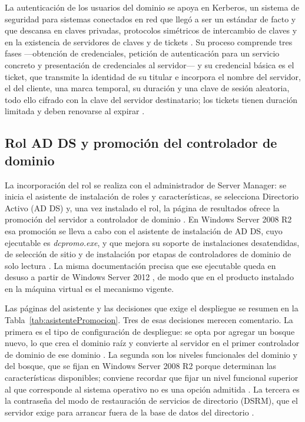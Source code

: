 \documentclass[12pt]{article}
\begin{document}
La autenticación de los usuarios del dominio se apoya en Kerberos, un sistema de seguridad para sistemas conectados en red que llegó a ser un estándar de facto y que descansa en claves privadas, protocolos simétricos de intercambio de claves y en la existencia de servidores de claves y de tickets \parencite[\S 9.7, p.\ 552]{carretero2001sistemas}. Su proceso comprende tres fases ---obtención de credenciales, petición de autenticación para un servicio concreto y presentación de credenciales al servidor--- y su credencial básica es el ticket, que transmite la identidad de su titular e incorpora el nombre del servidor, el del cliente, una marca temporal, su duración y una clave de sesión aleatoria, todo ello cifrado con la clave del servidor destinatario; los tickets tienen duración limitada y deben renovarse al expirar \parencite[\S 9.7, p.\ 554]{carretero2001sistemas}.

\subsection{Rol AD DS y promoción del controlador de dominio}
\label{sec:promocionControladorDominio}

La incorporación del rol se realiza con el administrador de Server Manager: se inicia el asistente de instalación de roles y características, se selecciona Directorio Activo (AD DS) y, una vez instalado el rol, la página de resultados ofrece la promoción del servidor a controlador de dominio \parencite{microsoftInstallADDS}. En Windows Server 2008 R2 esa promoción se lleva a cabo con el asistente de instalación de AD DS, cuyo ejecutable es \textit{dcpromo.exe}, y que mejora su soporte de instalaciones desatendidas, de selección de sitio y de instalación por etapas de controladores de dominio de solo lectura \parencite{microsoftADDSOverview}. La misma documentación precisa que ese ejecutable queda en desuso a partir de Windows Server 2012 \parencite{microsoftInstallADDS}, de modo que en el producto instalado en la máquina virtual es el mecanismo vigente.

Las páginas del asistente y las decisiones que exige el despliegue se resumen en la Tabla~\ref{tab:asistentePromocion}. Tres de esas decisiones merecen comentario. La primera es el tipo de configuración de despliegue: se opta por agregar un bosque nuevo, lo que crea el dominio raíz y convierte al servidor en el primer controlador de dominio de ese dominio \parencite{microsoftInstallADDS}. La segunda son los niveles funcionales del dominio y del bosque, que se fijan en Windows Server 2008 R2 porque determinan las características disponibles; conviene recordar que fijar un nivel funcional superior al que corresponde al sistema operativo no es una opción admitida \parencite{microsoftInstallADDS}. La tercera es la contraseña del modo de restauración de servicios de directorio (DSRM), que el servidor exige para arrancar fuera de la base de datos del directorio \parencite{microsoftInstallADDS}.
\end{document}
